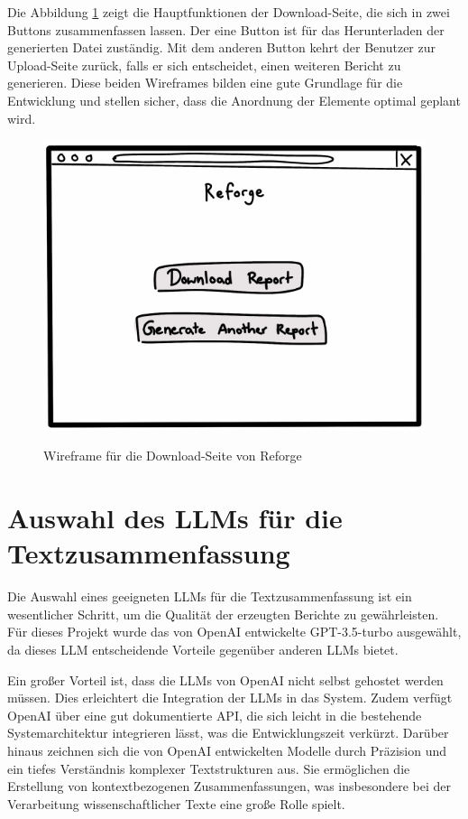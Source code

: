Die Abbildung \ref{fig:wireframe_download} zeigt die Hauptfunktionen der Download-Seite, die sich in zwei Buttons zusammenfassen lassen. Der eine Button ist für das Herunterladen der generierten Datei zuständig. Mit dem anderen Button kehrt der Benutzer zur Upload-Seite zurück, falls er sich entscheidet, einen weiteren Bericht zu generieren. Diese beiden Wireframes bilden eine gute Grundlage für die Entwicklung und stellen sicher, dass die Anordnung der Elemente optimal geplant wird.

\begin{figure}[H]
\centering
\includegraphics[width=0.5\linewidth]{Images/wireframe_download.pdf}\\
\caption{Wireframe für die Download-Seite von Reforge}
\label{fig:wireframe_download}
\end{figure}

\section{Auswahl des LLMs für die Textzusammenfassung}
\label{4.3_LLM}
Die Auswahl eines geeigneten \ac{LLM}s für die Textzusammenfassung ist ein wesentlicher Schritt, um die Qualität der erzeugten Berichte zu gewährleisten. Für dieses Projekt wurde das von OpenAI entwickelte \ac{GPT}-3.5-turbo ausgewählt, da dieses \ac{LLM} entscheidende Vorteile gegenüber anderen \ac{LLM}s bietet.

Ein großer Vorteil ist, dass die \ac{LLM}s von OpenAI nicht selbst gehostet werden müssen. Dies erleichtert die Integration der \ac{LLM}s in das System. Zudem verfügt OpenAI über eine gut dokumentierte \ac{API}, die sich leicht in die bestehende Systemarchitektur integrieren lässt, was die Entwicklungszeit verkürzt. Darüber hinaus zeichnen sich die von OpenAI entwickelten Modelle durch Präzision und ein tiefes Verständnis komplexer Textstrukturen aus. Sie ermöglichen die Erstellung von kontextbezogenen Zusammenfassungen, was insbesondere bei der Verarbeitung wissenschaftlicher Texte eine große Rolle spielt. 

